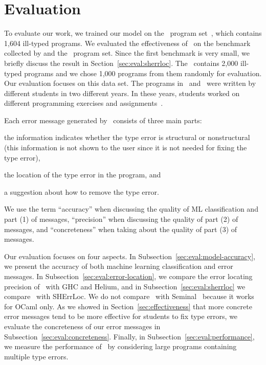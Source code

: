 \documentclass[12pt]{report}	%
\begin{document}
\section{Evaluation}
\label{sec:ml:eval}

To evaluate our work, we trained our model on the \trainset\
program set~\cite{Hage09:Neon}, which contains 1,604 ill-typed
programs. We evaluated the effectiveness of \newCompiler\
on the benchmark collected by \cite{Chen14:CFT} and the
\evalset\ program set. Since the first benchmark is
very small, we briefly discuss the result in
Section~\ref{sec:eval:sherrloc}. The \evalset\
contains 2,000 ill-typed
programs and we chose 1,000 programs from them randomly
for evaluation. Our evaluation focuses on this data set.
The programs in \trainset\ and \evalset\ were written by different
students in two different years. In these years, students worked
on different programming exercises and
assignments~\cite{Hage09:Neon}.


Each error message generated by \newCompiler\ consists
of three main parts: 
\begin{enumerate*}
\item the information indicates whether the type error is structural
or nonstructural (this information is not shown to the user since
it is not needed for fixing the type error),
\item the location of the type error in the program, and
\item a suggestion about how to remove the type error. 
\end{enumerate*}
%
We use the term ``accuracy'' when discussing the 
quality of ML classification and part (1) of messages, 
``precision'' when discussing the quality of part (2) 
of messages, and ``concreteness'' when taking about
the quality of part (3) of messages.

Our evaluation focuses on four aspects. 
In Subsection~\ref{sec:eval:model-accuracy}, we present
the accuracy of both machine learning classification
and error messages.
In Subsection~\ref{sec:eval:error-location},
we compare the error locating precision of \newCompiler\ with
GHC and Helium, and in Subsection~\ref{sec:eval:sherrloc}
we compare \newCompiler\ with SHErrLoc.
%
We do not compare \newCompiler\ with Seminal~\cite{Lerner07:STM}
because it works for OCaml only. 
%
As we showed in Section~\ref{sec:effectiveness} that more concrete error
messages tend to be more effective for students to
fix type errors, we evaluate the concreteness of
our error messages in Subsection~\ref{sec:eval:concreteness}.
Finally, in Subsection~\ref{sec:eval:performance}, we measure the
performance of \newCompiler\
by considering large programs containing multiple type errors.
\end{document}
